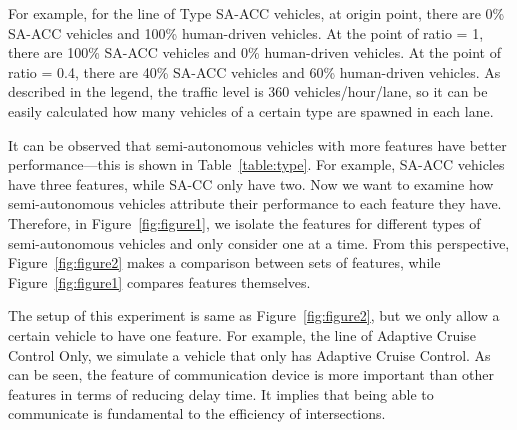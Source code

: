 For example, for the line of Type SA-ACC vehicles, at origin point,
there are 0\% SA-ACC vehicles and 100\% human-driven vehicles. At the
point of ratio = 1, there are 100\% SA-ACC vehicles and 0\%
human-driven vehicles. At the point of ratio = 0.4, there are 40\%
SA-ACC vehicles and 60\% human-driven vehicles. As described in the
legend, the traffic level is 360 vehicles/hour/lane, so it can be
easily calculated how many vehicles of a certain type are spawned in
each lane.

It can be observed that semi-autonomous vehicles with more features have better
performance---this is shown in Table~\ref{table:type}. For example,
SA-ACC vehicles have three features, while SA-CC only have two.
Now we want to examine how semi-autonomous vehicles attribute
their performance to each feature they have. Therefore, in
Figure~\ref{fig:figure1}, we isolate the features for different types
of semi-autonomous vehicles and only consider one at a time. From this
perspective, Figure~\ref{fig:figure2} makes a comparison between sets of
features, while Figure~\ref{fig:figure1} compares features themselves.

The setup of this experiment is same as Figure~\ref{fig:figure2}, but
we only allow a certain vehicle to have one feature. For example, the
line of Adaptive Cruise Control Only, we simulate a vehicle that only
has Adaptive Cruise Control.  As can be seen, the feature of
communication device is more important than other features in terms of
reducing delay time.  It implies that being able to communicate
is fundamental to the efficiency of intersections.




